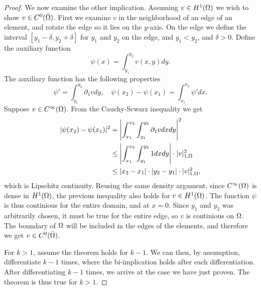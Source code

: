 \begin{proof}
    We now examine the other implication. 
    Assuming $v\in H^1(\Omega)$ we wish to show $v \in C^0(\bar{\Omega})$. 
    First we examine $v$ in the neighborhood of an edge of an element, and rotate the edge so it lies on the $y$-axis. 
    On the edge we define the interval $[y_1-\delta, y_2+\delta]$ for $y_1$ and $y_2$ on the edge, and $y_1<y_2$, and 
    $\delta > 0$.
    Define the auxiliary function
    \begin{equation}
        \psi (x) = \int_{y_1}^{y_2} v(x,y) dy.
    \end{equation}
    The auxiliary function has the following properties
    \begin{equation}
        \psi ' =\int_{y_1}^{y_2} \partial_1 v dy, \quad \psi(x_2) - \psi(x_1) =\int_{x_1}^{x_2} \psi ' dx.
    \end{equation}
    Suppose $v \in C^{\infty}(\Omega)$. From the Cauchy-Scwarz inequality we get
    \begin{align}
        |\psi(x_2) -\psi(x_1)|^2 &= \left| \int_{x_1}^{x_2} \int_{y_1}^{y_2} \partial_1 v dx dy \right|^2\\
        &\leq \left| \int_{x_1}^{x_2} \int_{y_1}^{y_2} 1 dx dy \right| \cdot | v |_{1, \Omega}^2\\
        &\leq |x_2 - x_1| \cdot |y_2 - y_1| \cdot | v |_{1, \Omega}^2,
    \end{align}
    which is Lipschitz continuity.
    Reusing the same density argument, since $C^\infty(\Omega)$ is dense in $H^1(\Omega)$, the previous inequality 
    also holds for $v\in H^1(\Omega)$.
    The function $\psi$ is thus continious for the entire domain, and at $x=0$. 
    Since $y_1$ and $y_2$ was arbitrarily chosen, it must be true for the entire edge,
    so $v$ is continious on $\Omega$. 
    The boundary of $\Omega$ will be included in the edges of the elements,
    and therefore we get $v\in C^0(\bar{\Omega})$.

    For $k>1$, assume the theorem holds for $k-1$. We can then, by assumption, differentiate 
    $k-1$ times, where the bi-implication holds after each differentiation. 
    After differentiating $k-1$ times, we arrive at the case we have just proven. 
    The theorem is thus true for $k>1$.
\end{proof}